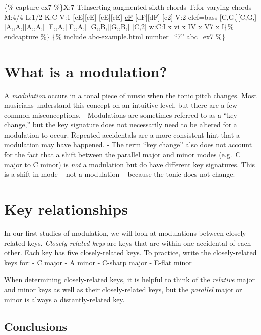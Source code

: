 \documentclass{book}
\begin{document}
\{\% capture ex7 \%\}X:7 T:Inserting augmented sixth chords T:for varying
chords M:4/4 L:1/2 K:C V:1 {[}cE{]}{[}cE{]}\textbar{}
{[}cE{]}{[}cE{]}\textbar{} \href{cantusFirmus.html}{cF}\textbar{}
{[}dF{]}{[}dF{]}\textbar{} {[}c2{]}\textbar{]} V:2 clef=bass
{[}C,G,{]}{[}C,G,{]}\textbar{} {[}A,,A,{]}{[}A,,A,{]}\textbar{}
{[}F,,A,{]}{[}F,,A,{]}\textbar{} {[}G,,B,{]}{[}G,,B,{]}\textbar{}
{[}C,2{]}\textbar{]} w:C:I x vi x IV x V7 x I\{\% endcapture \%\} \{\% include
abc-example.html number=``7'' abc=ex7 \%\}

\hypertarget{what-is-a-modulation}{%
\section{What is a modulation?}\label{what-is-a-modulation}}

A \emph{modulation} occurs in a tonal piece of music when the tonic pitch
changes. Most musicians understand this concept on an intuitive level, but
there are a few common misconceptions. - Modulations are sometimes referred to
as a ``key change,'' but the key signature does not necessarily need to be
altered for a modulation to occur. Repeated accidentals are a more consistent
hint that a modulation may have happened. - The term ``key change'' also does
not account for the fact that a shift between the parallel major and minor
modes (e.g.~C major to C minor) is \emph{not} a modulation but do have
different key signatures. This is a shift in mode -- not a modulation --
because the tonic does not change.

\hypertarget{key-relationships}{%
\section{Key relationships}\label{key-relationships}}

In our first studies of modulation, we will look at modulations between
closely-related keys. \emph{Closely-related keys} are keys that are within one
accidental of each other. Each key has five closely-related keys. To practice,
write the closely-related keys for: - C major - A minor - C-sharp major -
E-flat minor

When determining closely-related keys, it is helpful to think of the
\emph{relative} major and minor keys as well as their closely-related keys,
but the \emph{parallel} major or minor is always a distantly-related key.

\hypertarget{conclusions-7}{%
\subsection{Conclusions}\label{conclusions-7}}
\end{document}

